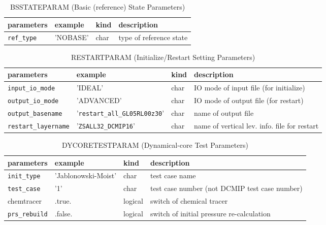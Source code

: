 \begin{table}[htb]
\begin{center}
\caption{BSSTATEPARAM (Basic (reference) State Parameters)}
\begin{tabularx}{150mm}{|l|l|l|X|} \hline
 \rowcolor[gray]{0.9} parameters & example & kind & description          \\ \hline
 \verb|ref_type| & 'NOBASE' & char & type of reference state \\ \hline
\end{tabularx}
\end{center}
\end{table}

\begin{table}[htb]
\begin{center}
\caption{RESTARTPARAM (Initialize/Restart Setting Parameters)}
\begin{tabularx}{150mm}{|l|l|l|X|} \hline
 \rowcolor[gray]{0.9} parameters & example & kind & description          \\ \hline
 \verb|input_io_mode|     & 'IDEAL'                   & char & IO mode of input file (for initialize) \\ \hline
 \verb|output_io_mode|    & 'ADVANCED'                & char & IO mode of output file (for restart) \\ \hline
 \verb|output_basename|   & '\verb|restart_all_GL05RL00z30|' & char & name of output file \\ \hline
 \verb|restart_layername| & '\verb|ZSALL32_DCMIP16|'         & char & name of vertical lev. info. file for restart \\ \hline
\end{tabularx}
\end{center}
\end{table}

\begin{table}[htb]
\begin{center}
\caption{DYCORETESTPARAM (Dynamical-core Test Parameters)}
\begin{tabularx}{150mm}{|l|l|l|X|} \hline
 \rowcolor[gray]{0.9} parameters & example & kind & description          \\ \hline
 \verb|init_type|    & 'Jablonowski-Moist' & char & test case name \\ \hline
 \verb|test_case|    & '1'     & char & test case number (not DCMIP test case number) \\ \hline
 chemtracer   & .true.  & logical & switch of chemical tracer \\ \hline
 \verb|prs_rebuild|  & .false. & logical & switch of initial pressure re-calculation\\ \hline
\end{tabularx}
\end{center}
\end{table}

